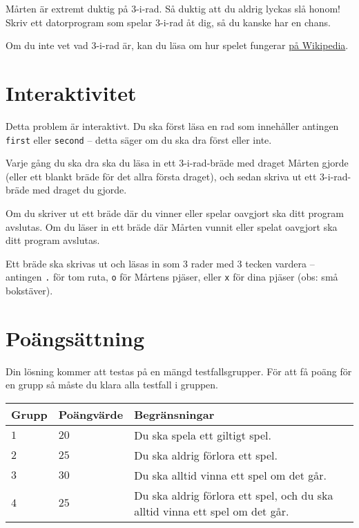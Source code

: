 
Mårten är extremt duktig på 3-i-rad. Så duktig att du aldrig lyckas slå honom! Skriv ett datorprogram som spelar 3-i-rad åt dig, så du kanske har en chans.

Om du inte vet vad 3-i-rad är, kan du läsa om hur spelet fungerar \href{https://sv.wikipedia.org/wiki/Tre_i_rad}{på Wikipedia}.

\section*{Interaktivitet}
Detta problem är interaktivt. Du ska först läsa en rad som innehåller antingen \texttt{first} eller \texttt{second} -- detta säger om du ska dra först eller inte.

Varje gång du ska dra ska du läsa in ett 3-i-rad-bräde med draget Mårten gjorde
(eller ett blankt bräde för det allra första draget),
och sedan skriva ut ett 3-i-rad-bräde med draget du gjorde.

Om du skriver ut ett bräde där du vinner eller spelar oavgjort ska ditt program avslutas. Om du läser in ett bräde där Mårten vunnit eller spelat oavgjort ska ditt program avslutas.

Ett bräde ska skrivas ut och läsas in som 3 rader med 3 tecken vardera -- antingen \texttt{.} för tom ruta, \texttt{o} för Mårtens pjäser, eller \texttt{x} för dina pjäser (obs: små bokstäver).

\section*{Poängsättning}
Din lösning kommer att testas på en mängd testfallsgrupper. För att få poäng för en grupp så måste du klara alla testfall i gruppen.

\begin{tabular}{| l | l | l |}
	\hline
	Grupp & Poängvärde & Begränsningar\\ \hline
 $1$    & $20$        & Du ska spela ett giltigt spel. \\ \hline
 $2$    & $25$        & Du ska aldrig förlora ett spel. \\ \hline
 $3$    & $30$        & Du ska alltid vinna ett spel om det går. \\ \hline
 $4$    & $25$        & Du ska aldrig förlora ett spel, och du ska alltid vinna ett spel om det går. \\ \hline
\end{tabular}
